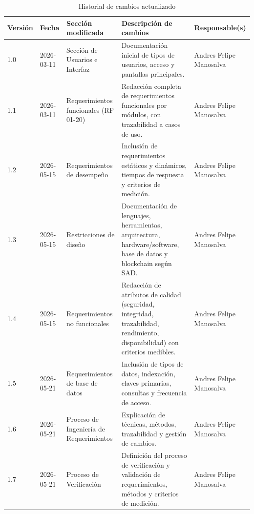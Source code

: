 \documentclass[12pt,letterpaper]{article}
\begin{document}
\begin{table}[h]
    \centering
    \scriptsize
    \renewcommand{\arraystretch}{1.2}
    \begin{tabular}{p{1cm}p{2cm}p{3.5cm}p{6.5cm}p{3cm}}
        \toprule
        \textbf{Versión} & \textbf{Fecha} & \textbf{Sección modificada} &
        \textbf{Descripción de cambios} & \textbf{Responsable(s)} \\
        \midrule
        1.0 & 2026-03-11 & Sección de Usuarios e Interfaz &
        Documentación inicial de tipos de usuarios, acceso y pantallas principales. &
        Andres Felipe Manosalva \\

        1.1 & 2026-03-11 & Requerimientos funcionales (RF 01-20) &
        Redacción completa de requerimientos funcionales por módulos, con trazabilidad a casos de uso. &
        Andres Felipe Manosalva \\

        1.2 & 2026-05-15 & Requerimientos de desempeño &
        Inclusión de requerimientos estáticos y dinámicos, tiempos de respuesta y criterios de medición. &
        Andres Felipe Manosalva \\

        1.3 & 2026-05-15 & Restricciones de diseño &
        Documentación de lenguajes, herramientas, arquitectura, hardware/software, base de datos y blockchain según SAD. &
        Andres Felipe Manosalva \\

        1.4 & 2026-05-15 & Requerimientos no funcionales &
        Redacción de atributos de calidad (seguridad, integridad, trazabilidad, rendimiento, disponibilidad) con criterios medibles. &
        Andres Felipe Manosalva \\

        1.5 & 2026-05-21 & Requerimientos de base de datos &
        Inclusión de tipos de datos, indexación, claves primarias, consultas y frecuencia de acceso. &
        Andres Felipe Manosalva \\

        1.6 & 2026-05-21 & Proceso de Ingeniería de Requerimientos &
        Explicación de técnicas, métodos, trazabilidad y gestión de cambios. &
        Andres Felipe Manosalva \\

        1.7 & 2026-05-21 & Proceso de Verificación &
        Definición del proceso de verificación y validación de requerimientos, métodos y criterios de medición. &
        Andres Felipe Manosalva \\
        \bottomrule
    \end{tabular}
    \caption{Historial de cambios actualizado}
    \label{tab:historial_cambios}
\end{table}
\end{document}
